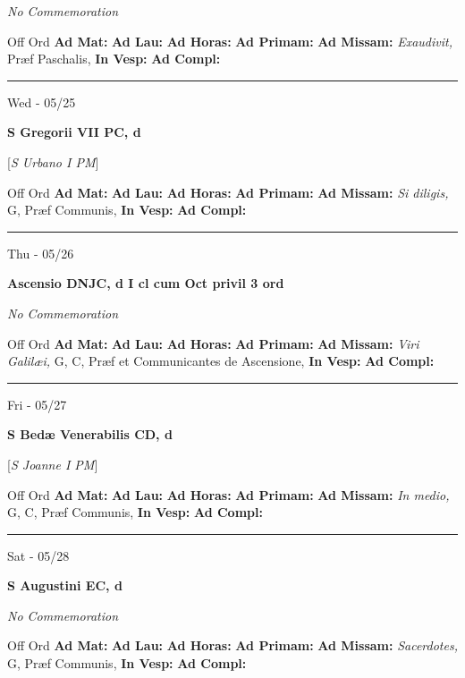 \documentclass[letterpaper, 10pt]{article}
\begin{document}
\textit{No Commemoration}\begin{justify}
Off Ord
\textbf{Ad Mat: }
\textbf{Ad Lau: }
\textbf{Ad Horas: }
\textbf{Ad Primam: }
\textbf{Ad Missam:} \textit{Exaudivit, } Præf Paschalis, 
\textbf{In Vesp: }
\textbf{Ad Compl: }\end{justify}



\hrule
\begin{center}
Wed - 05/25
\end{center}\textbf{ \large S Gregorii VII PC, \textnormal{\normalsize d}}

[\textit{S Urbano I PM}]
\begin{justify}
Off Ord
\textbf{Ad Mat: }
\textbf{Ad Lau: }
\textbf{Ad Horas: }
\textbf{Ad Primam: }
\textbf{Ad Missam:} \textit{Si diligis, } G, Præf Communis, 
\textbf{In Vesp: }
\textbf{Ad Compl: }\end{justify}



\hrule
\begin{center}
Thu - 05/26
\end{center}\textbf{ \large Ascensio DNJC, \textnormal{\normalsize d I cl cum Oct privil 3 ord}}

\textit{No Commemoration}\begin{justify}
Off Ord
\textbf{Ad Mat: }
\textbf{Ad Lau: }
\textbf{Ad Horas: }
\textbf{Ad Primam: }
\textbf{Ad Missam:} \textit{Viri Galilæi, } G, C, Præf et Communicantes de Ascensione, 
\textbf{In Vesp: }
\textbf{Ad Compl: }\end{justify}



\hrule
\begin{center}
Fri - 05/27
\end{center}\textbf{ \large S Bedæ Venerabilis CD, \textnormal{\normalsize d}}

[\textit{S Joanne I PM}]
\begin{justify}
Off Ord
\textbf{Ad Mat: }
\textbf{Ad Lau: }
\textbf{Ad Horas: }
\textbf{Ad Primam: }
\textbf{Ad Missam:} \textit{In medio, } G, C, Præf Communis, 
\textbf{In Vesp: }
\textbf{Ad Compl: }\end{justify}



\hrule
\begin{center}
Sat - 05/28
\end{center}\textbf{ \large S Augustini EC, \textnormal{\normalsize d}}

\textit{No Commemoration}\begin{justify}
Off Ord
\textbf{Ad Mat: }
\textbf{Ad Lau: }
\textbf{Ad Horas: }
\textbf{Ad Primam: }
\textbf{Ad Missam:} \textit{Sacerdotes, } G, Præf Communis, 
\textbf{In Vesp: }
\textbf{Ad Compl: }\end{justify}
\end{document}
